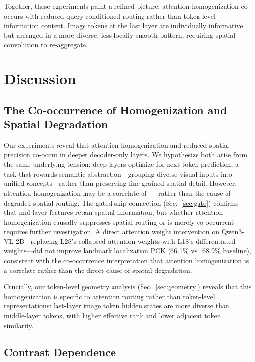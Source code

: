 \documentclass[10pt,twocolumn,letterpaper]{article}
\begin{document}
Together, these experiments paint a refined picture: attention homogenization co-occurs with reduced query-conditioned routing rather than token-level information content. Image tokens at the last layer are individually informative but arranged in a more diverse, less locally smooth pattern, requiring spatial convolution to re-aggregate.

\section{Discussion}
\label{sec:disc}

\subsection{The Co-occurrence of Homogenization and Spatial Degradation}

Our experiments reveal that attention homogenization and reduced spatial precision co-occur in deeper decoder-only layers. We hypothesize both arise from the same underlying tension: deep layers optimize for next-token prediction, a task that rewards semantic abstraction---grouping diverse visual inputs into unified concepts---rather than preserving fine-grained spatial detail. However, attention homogenization may be a correlate of --- rather than the cause of --- degraded spatial routing. The gated skip connection (Sec.~\ref{sec:gate}) confirms that mid-layer features retain spatial information, but whether attention homogenization causally suppresses spatial routing or is merely co-occurrent requires further investigation. A direct attention weight intervention on Qwen3-VL-2B---replacing L28's collapsed attention weights with L18's differentiated weights---did not improve landmark localization PCK (66.1\% vs.~68.9\% baseline), consistent with the co-occurrence interpretation that attention homogenization is a correlate rather than the direct cause of spatial degradation.

Crucially, our token-level geometry analysis (Sec.~\ref{sec:geometry}) reveals that this homogenization is specific to attention routing rather than token-level representations: last-layer image token hidden states are more diverse than middle-layer tokens, with higher effective rank and lower adjacent token similarity.

\subsection{Contrast Dependence}
\end{document}
